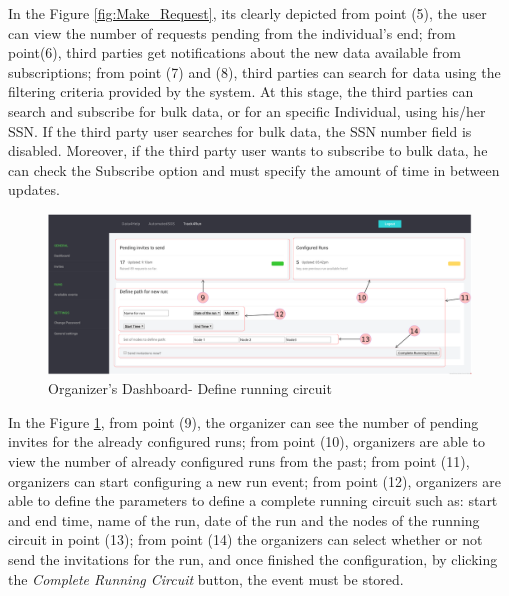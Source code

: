 \documentclass[a4paper, hidelinks, 12pt]{report}
\begin{document}
	In the Figure \ref{fig:Make_Request}, its clearly depicted from point (5), the user can view the number of requests pending from the individual's end; from point(6), third parties get notifications about the new data available from subscriptions; from point (7) and (8), third parties can search for data using the filtering criteria provided by the system. At this stage, the third parties can search and subscribe for bulk data, or for an specific Individual, using his/her SSN. If the third party user searches for bulk data, the SSN number field is disabled. Moreover, if the third party user wants to subscribe to bulk data, he can check the Subscribe option and must specify the amount of time in between updates.
	
	\begin{figure}[H]
		\centering
		\includegraphics[width=1\textwidth]{Diagrams/ui/t4r_organizer_new_event.png}\caption[UI: Organizer's Dashboard - Define running circuit]{Organizer's Dashboard- Define running circuit}
		\label{fig:organizer_dashboard}
	\end{figure}	
	
	In the Figure \ref{fig:organizer_dashboard}, from point (9), the organizer can see the number of pending invites for the already configured runs; from point (10), organizers are able to view the number of already configured runs from the past; from point (11), organizers can start configuring a new run event;	from point (12), organizers are able to define the parameters to define a complete running circuit such as: start and end time, name of the run, date of the run and the nodes of the running circuit in point (13); from point (14) the organizers can select whether or not send the invitations for the run, and once finished the configuration, by clicking the \textit{Complete Running Circuit} button, the event must be stored.
	
\end{document}
